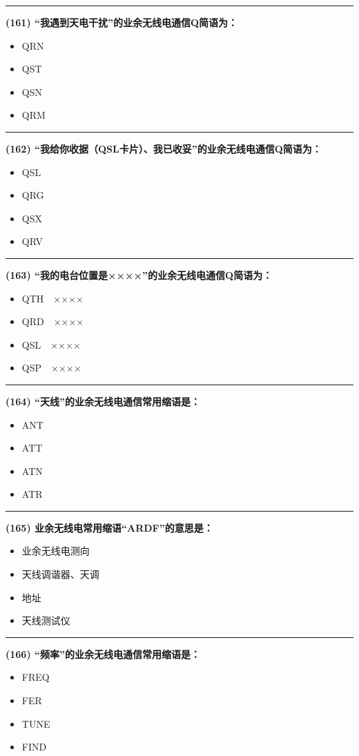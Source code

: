 \documentclass[twocolumn]{ctexart}  %
\begin{document}
\noindent\rule{0.5\textwidth}{1pt}
\heiti \textbf{(161) “我遇到天电干扰”的业余无线电通信Q简语为：} \songti {\color{gray} [LK0294] }
\begin{itemize}
	\item  QRN
	\item  QST
	\item  QSN
	\item  QRM
\end{itemize}


\noindent\rule{0.5\textwidth}{1pt}
\heiti \textbf{(162) “我给你收据（QSL卡片）、我已收妥”的业余无线电通信Q简语为：} \songti {\color{gray} [LK0313] }
\begin{itemize}
	\item  QSL
	\item  QRG
	\item  QSX
	\item  QRV
\end{itemize}


\noindent\rule{0.5\textwidth}{1pt}
\heiti \textbf{(163) “我的电台位置是××××”的业余无线电通信Q简语为：} \songti {\color{gray} [LK0321] }
\begin{itemize}
	\item  QTH　××××
	\item  QRD　××××
	\item  QSL　××××
	\item  QSP　××××
\end{itemize}


\noindent\rule{0.5\textwidth}{1pt}
\heiti \textbf{(164) “天线”的业余无线电通信常用缩语是：} \songti {\color{gray} [LK0331] }
\begin{itemize}
	\item  ANT
	\item  ATT
	\item  ATN
	\item  ATR
\end{itemize}


\noindent\rule{0.5\textwidth}{1pt}
\heiti \textbf{(165) 业余无线电常用缩语“ARDF”的意思是：} \songti {\color{gray} [LK0332] }
\begin{itemize}
	\item  业余无线电测向
	\item  天线调谐器、天调
	\item  地址
	\item  天线测试仪
\end{itemize}


\noindent\rule{0.5\textwidth}{1pt}
\heiti \textbf{(166) “频率”的业余无线电通信常用缩语是：} \songti {\color{gray} [LK0352] }
\begin{itemize}
	\item  FREQ
	\item  FER
	\item  TUNE
	\item  FIND
\end{itemize}
\end{document}
